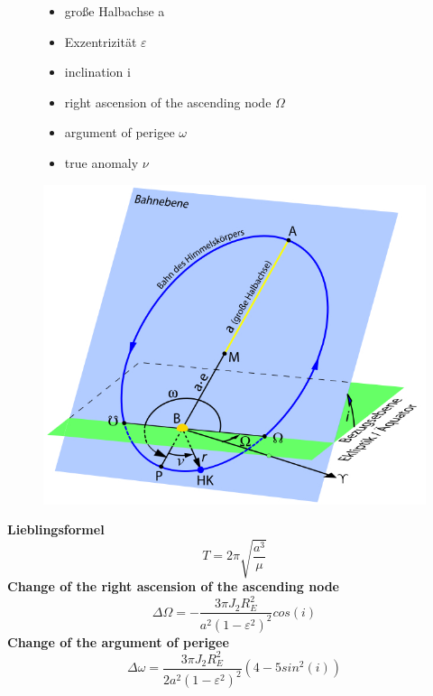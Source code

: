 \documentclass[a4paper,10pt]{article}
\newcommand{\f}{\textbf}
\begin{document}
\begin{figure}[!ht]
\begin{minipage}{0.35\textwidth}
 \begin{itemize}
  \item große Halbachse a
  \item Exzentrizität $\varepsilon$
  \item inclination i
  \item right ascension of the ascending node $\Omega$
  \item argument of perigee $\omega$
  \item true anomaly $\nu$
 \end{itemize} 
\end{minipage}
\hfill
\begin{minipage}{0.64\textwidth}
  \centering
  \includegraphics[scale=0.55]{BahnelementeEllipse}
\end{minipage}
\end{figure}
\noindent \f{Lieblingsformel}
\[T = 2\pi\sqrt{\frac{a^3}{\mu}}\]
\f{Change of the right ascension of the ascending node}
\[\Delta \Omega = - \frac{3\pi J_2R_E^2}{a^2(1-\varepsilon^2)^2}cos(i)\]
\f{Change of the argument of perigee}
\[\Delta \omega = \frac{3\pi J_2R_E^2}{2a^2(1-\varepsilon^2)^2}(4-5sin^2(i))\]
\end{document}
